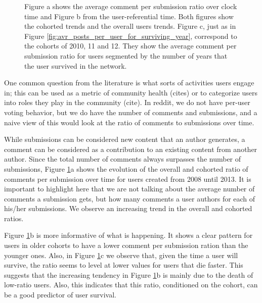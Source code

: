 \begin{figure}[!tb]
\begin{subfigure}{1\textwidth}
\caption{}\end{subfigure}
\caption{Figure a shows the average comment per submission ratio over clock time and Figure b from the user-referential time. Both figures show the cohorted trends and the overall users trends. Figure c, just as in Figure \ref{fig:avr_posts_per_user_for_surviving_year}, correspond to the cohorts of 2010, 11 and 12. They show the average comment per submission ratio for users segmented by the number of years that the user survived in the network.}
\label{fig:comments_submissions}
\end{figure}

One common question from the literature is what sorts of activities users engage in; this can be used as a metric of community health (cites) or to categorize users into roles they play in the community (cite).  In reddit, we do not have per-user voting behavior, but we do have the number of comments and submissions, and a naive view of this would look at the ratio of comments to submissions over time.

While submissions can be considered new content that an author generates, a comment can be considered as a contribution to an existing content from another author. Since the total number of comments always surpasses the number of submissions, Figure \ref{fig:comments_submissions}a shows the evolution of the overall and cohorted ratio of comments per submission over time for users created from 2008 until 2013. It is important to highlight here that we are not talking about the average number of comments a submission gets, but how many comments a user authors for each of his/her submissions. We observe an increasing trend in the overall and cohorted ratios.

Figure \ref{fig:comments_submissions}b is more informative of what is happening. It shows a clear pattern for users in older cohorts to have a lower comment per submission ration than the younger ones. Also, in Figure \ref{fig:comments_submissions}c we observe that, given the time a user will survive, the ratio seems to level at lower values for users that die faster. This suggests that the increasing tendency in Figure \ref{fig:comments_submissions}b is mainly due to the death of low-ratio users. Also, this indicates that this ratio, conditioned on the cohort, can be a good predictor of user survival.


